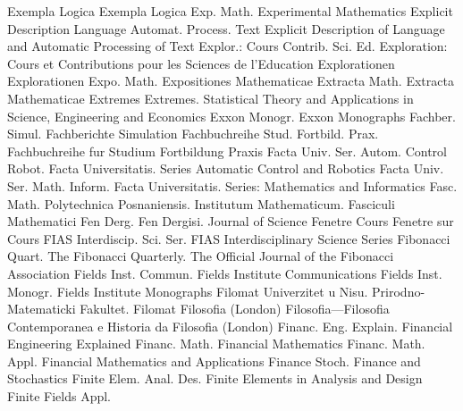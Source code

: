 {Exempla Logica}
{Exempla Logica}
{Exp. Math.}
{Experimental Mathematics}
{Explicit Description Language Automat. Process. Text}
{Explicit Description of Language and Automatic Processing of Text}
{Explor.: Cours Contrib. Sci. Ed.}
{Exploration: Cours et Contributions pour les Sciences de l'Education}
{Explorationen}
{Explorationen}
{Expo. Math.}
{Expositiones Mathematicae}
{Extracta Math.}
{Extracta Mathematicae}
{Extremes}
{Extremes. Statistical Theory and Applications in Science, Engineering and Economics}
{Exxon Monogr.}
{Exxon Monographs}
{Fachber. Simul.}
{Fachberichte Simulation}
{Fachbuchreihe Stud. Fortbild. Prax.}
{Fachbuchreihe fur Studium Fortbildung Praxis}
{Facta Univ. Ser. Autom. Control Robot.}
{Facta Universitatis. Series Automatic Control and Robotics}
{Facta Univ. Ser. Math. Inform.}
{Facta Universitatis. Series: Mathematics and Informatics}
{Fasc. Math.}
{Polytechnica Posnaniensis. Institutum Mathematicum. Fasciculi Mathematici}
{Fen Derg.}
{Fen Dergisi. Journal of Science}
{Fenetre Cours}
{Fenetre sur Cours}
{FIAS Interdiscip. Sci. Ser.}
{FIAS Interdisciplinary Science Series}
{Fibonacci Quart.}
{The Fibonacci Quarterly. The Official Journal of the Fibonacci Association}
{Fields Inst. Commun.}
{Fields Institute Communications}
{Fields Inst. Monogr.}
{Fields Institute Monographs}
{Filomat}
{Univerzitet u Nisu. Prirodno-Matematicki Fakultet. Filomat}
{Filosofia (London)}
{Filosofia---Filosofia Contemporanea e Historia da Filosofia (London)}
{Financ. Eng. Explain.}
{Financial Engineering Explained}
{Financ. Math.}
{Financial Mathematics}
{Financ. Math. Appl.}
{Financial Mathematics and Applications}
{Finance Stoch.}
{Finance and Stochastics}
{Finite Elem. Anal. Des.}
{Finite Elements in Analysis and Design}
{Finite Fields Appl.}
